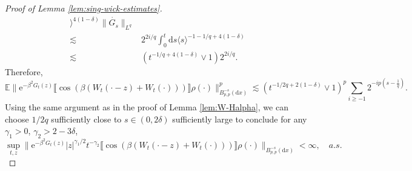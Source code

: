 \documentclass[11pt, a4paper]{scrartcl}
\numberwithin{equation}{section}
\theoremstyle{plain}
\theoremstyle{remark}
\newcommand{\mathd}{\mathrm{d}}
\newcommand{\mathe}{\mathrm{e}}
\begin{document}
\begin{proof}[Proof of Lemma \ref{lem:sing-wick-estimates}]
{\[\begin{aligned}
					\rangle^{4 (1 - \delta)} \| \dot{G_s}  \|_{L^q}                          \\
					\lesssim  & 2^{2 i / q}  \int_0^t \mathd s \langle s \rangle^{- 1 - 1 /
					q + 4 (1 - \delta)}                                                      \\
					\lesssim  & (t^{- 1 / q + 4 (1 - \delta)} \vee 1) 2^{2 i / q} .
				\end{aligned} \]}
	Therefore,
	{\small \[ \mathbb{E} \| \mathe^{- \beta^2 G_t (z)} \llbracket \cos (\beta (W_t
				(\cdot - z) + W_t (\cdot))) \rrbracket \rho (\cdot) \|^p_{B^{- s}_{p, p}
						(\mathd x)} \lesssim (t^{- 1 / 2 q + 2 (1 - \delta)} \vee 1)^p \sum_{i
					\geqslant - 1} 2^{- ip \left( s - \frac{1}{q} \right)} . \]}Using the same argument as in the proof of Lemma \ref{lem:W-Halpha}, we can
	choose $1 / 2 q$ sufficiently close to $s \in (0, 2 \delta)$ sufficiently
	large to conclude for any $\gamma_1 > 0$, $\gamma_2 > 2 - 3 \delta$,
	\[ \sup_{t, z} \| \mathe^{- \beta^2 G_t (z)} | z |^{\gamma_1 / 2} t^{-
				\gamma_2} \llbracket \cos (\beta (W_t (\cdot - z) + W_t (\cdot)))
		\rrbracket \rho (\cdot) \|_{B^{- s}_{p, p} (\mathd x)} < \infty, \quad
		a.s. \]
\end{proof}

\end{document}
